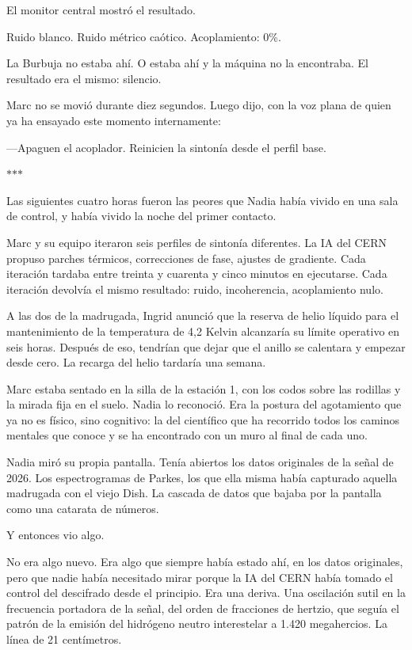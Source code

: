 \documentclass[11pt,a5paper,twoside]{book}
\begin{document}
El monitor central mostró el resultado.

Ruido blanco. Ruido métrico caótico. Acoplamiento: 0\%.

La Burbuja no estaba ahí. O estaba ahí y la máquina no la encontraba. El resultado era el mismo: silencio.

Marc no se movió durante diez segundos. Luego dijo, con la voz plana de quien ya ha ensayado este momento internamente:

—Apaguen el acoplador. Reinicien la sintonía desde el perfil base.

\vspace{1.5em}
\begin{center}$\ast$\quad$\ast$\quad$\ast$\end{center}
\vspace{1.5em}

Las siguientes cuatro horas fueron las peores que Nadia había vivido en una sala de control, y había vivido la noche del primer contacto.

Marc y su equipo iteraron seis perfiles de sintonía diferentes. La IA del CERN propuso parches térmicos, correcciones de fase, ajustes de gradiente. Cada iteración tardaba entre treinta y cuarenta y cinco minutos en ejecutarse. Cada iteración devolvía el mismo resultado: ruido, incoherencia, acoplamiento nulo.

A las dos de la madrugada, Ingrid anunció que la reserva de helio líquido para el mantenimiento de la temperatura de 4,2 Kelvin alcanzaría su límite operativo en seis horas. Después de eso, tendrían que dejar que el anillo se calentara y empezar desde cero. La recarga del helio tardaría una semana.

Marc estaba sentado en la silla de la estación 1, con los codos sobre las rodillas y la mirada fija en el suelo. Nadia lo reconoció. Era la postura del agotamiento que ya no es físico, sino cognitivo: la del científico que ha recorrido todos los caminos mentales que conoce y se ha encontrado con un muro al final de cada uno.

Nadia miró su propia pantalla. Tenía abiertos los datos originales de la señal de 2026. Los espectrogramas de Parkes, los que ella misma había capturado aquella madrugada con el viejo Dish. La cascada de datos que bajaba por la pantalla como una catarata de números.

Y entonces vio algo.

No era algo nuevo. Era algo que siempre había estado ahí, en los datos originales, pero que nadie había necesitado mirar porque la IA del CERN había tomado el control del descifrado desde el principio. Era una deriva. Una oscilación sutil en la frecuencia portadora de la señal, del orden de fracciones de hertzio, que seguía el patrón de la emisión del hidrógeno neutro interestelar a 1.420 megahercios. La línea de 21 centímetros.
\end{document}

